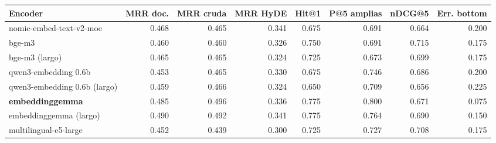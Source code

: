 \begin{tabular}{lrrrrrrr}
\toprule
Encoder & MRR doc. & MRR cruda & MRR HyDE & Hit@1 & P@5 amplias & nDCG@5 & Err. bottom \\
\midrule
nomic-embed-text-v2-moe & 0.468 & 0.465 & 0.341 & 0.675 & 0.691 & 0.664 & 0.200 \\
bge-m3 & 0.460 & 0.460 & 0.326 & 0.750 & 0.691 & 0.715 & 0.175 \\
bge-m3 (largo) & 0.465 & 0.465 & 0.324 & 0.725 & 0.673 & 0.699 & 0.175 \\
qwen3-embedding 0.6b & 0.453 & 0.465 & 0.330 & 0.675 & 0.746 & 0.686 & 0.200 \\
qwen3-embedding 0.6b (largo) & 0.459 & 0.466 & 0.324 & 0.650 & 0.709 & 0.656 & 0.225 \\
\textbf{embeddinggemma} & 0.485 & 0.496 & 0.336 & 0.775 & 0.800 & 0.671 & 0.075 \\
embeddinggemma (largo) & 0.490 & 0.492 & 0.341 & 0.775 & 0.764 & 0.690 & 0.150 \\
multilingual-e5-large & 0.452 & 0.439 & 0.300 & 0.725 & 0.727 & 0.708 & 0.175 \\
\bottomrule
\end{tabular}
